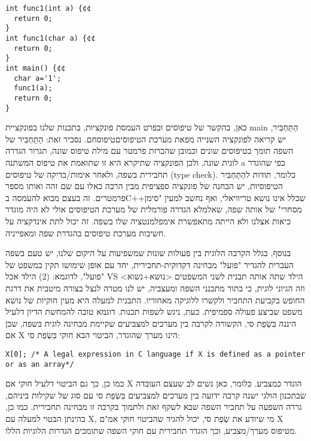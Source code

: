 \begin{טבלא}[!htbp]
\begin{verbatim}
int func1(int a) {¢¢
  return 0;
}
int func1(char a) {¢¢
  return 0;
}
int main() {¢¢
  char a='1';
  func1(a);
  return 0;
}
\end{verbatim}

      כאן, בהקשר של טיפוסים ובפרט העמסת פונקציות, בתכנות שלנו בפונקציית main הַתַּחְבִּיר,
      יש קריאה לפונקציה השנייה מפאת מערכת הטיפוסיםטיפוסחם. נסביר זאת: הַתַּחְבִּיר של השפה
      תומך בטיפוסים שונים וכמובן שהכרזת פרמטר עם מילת טיפוס שונה, תגרור הגדרה לוגית
      שונה, ולכן הפונקציה שתיקרא היא זו שתואמת את טיפוס המשתנה a כפי שהוגדר תחבירית
      בשפה, ולאחר אימות/בדיקה של טיפוסים (type check). כלומר, תודות להַתַּחְבִּיר
      הטיפוסיות, יש הבחנה של פונקציה ספציפית מבין הרבה כאלו עם שם זהה ואותו מספר
      פרמטרים. זה בעצם מבוא להעמסה בC++שכלל אינו נושא טריוויאלי, ואף נחשב למעין
      "סימן מסחרי" של אותה שפה, שאלמלא הגדרה פורמלית של מערכת הטיפוסים אולי לא היה
      מוגדר כיאות אצלנו ולא הייתה מתאפשרת אימפלמנטציה שלו בשפה. זה יכול לתת אינדקציה
      על חשיבות מערכת טיפוסים בהגדרת שפה ומאפייניה.

      בנוסף, בגלל הקרבה הלוגית בין פעולות שונות שמשפיעות על היקום שלנו, יש טעם בשפה
      העברית להגדיר "פועל" מבחינה דקדוקית-תחבירית, יחד עם אופן שימושו תקין במשפט של
      "פועל", לדוגמא: (2) הילד אכל VS הילד שתה
      אותה תבנית לשני המשפטים <נושא+נשוא> וזה הגיוני לוגית, כי בתור מתכנני השפה ומעצביה, יש לנו מטרה לנצל בצורה מיטבית את דרגת החופש בקביעת התחביר ולקשרו ללוגיקה מאחוריו. התבנית למעלה היא מעין חוקיות של נושא משפט שביצע פעולה ספמיפית.
      כעת, ניגש לשפות תכנות.
      דוגמא טובה להמחשת הדיון דלעיל היננה בִּשְׂפַת סי, הקשורה לקרבה בין מערכים למצביעים שקיימת מבחינה לוגית בשפה, שכן אם X הינו מערך שהוגדר, הביטוי הבא חוקי בִּשְׂפַת סי:

\begin{verbatim}
X[0]; /* A legal expression in C language if X is defined as a pointer or as an array*/
\end{verbatim}

      כמו כן, כך גם הביטוי דלעיל חוקי אם X הוגדר כמצביע. כלומר, כאן נשים לב שעצם
      העובדה שבתכנון הולגי ישנה קרבה ידועה בין מערכים למצביעים בִּשְׂפַת סי עם סוג של
      שקילות ביניהם, גררה השפעה על תחביר השפה שבא לשקף זאת ולתמוך בקרבה זו מבחינה
      תחבירית. כמו כן, בהינתן הבטוי למעלה עם X, מי שיודע את שְׂפַת סי, יכול להגיד
      שהביטוי חוקי אמ"ם X מטיפוס מערך/מצביע, וכך הוגדר תחבירית עם חוקי השפה שתומכים
      הגדרות הלוגיות הללו.


\end{טבלא}
